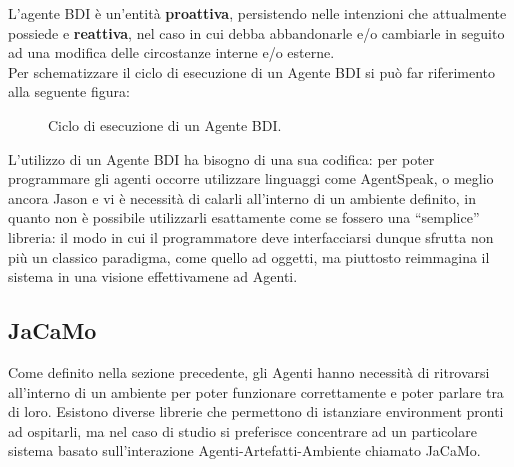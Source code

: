 \documentclass[12pt,a4paper,openright,oneside]{report}
\newcommand{\quotes}[1]{``#1''}
\begin{document}
L'agente BDI è un'entità \textbf{proattiva}, persistendo nelle intenzioni che attualmente possiede e \textbf{reattiva}, nel caso in cui debba abbandonarle e/o cambiarle in seguito ad una modifica delle circostanze interne e/o esterne.\\

Per schematizzare il ciclo di esecuzione di un Agente BDI si può far riferimento alla seguente figura:

\begin{figure}[h]
	\centering
	\caption{Ciclo di esecuzione di un Agente BDI.}
	\label{fig:jacamo}
\end{figure}

L'utilizzo di un Agente BDI ha bisogno di una sua codifica: per poter programmare gli agenti occorre utilizzare linguaggi come AgentSpeak, o meglio ancora Jason e vi è necessità di calarli all'interno di un ambiente definito, in quanto non è possibile utilizzarli esattamente come se fossero una \quotes{semplice} libreria: il modo in cui il programmatore deve interfacciarsi dunque sfrutta non più un classico paradigma, come quello ad oggetti, ma piuttosto reimmagina il sistema in una visione effettivamene ad Agenti.

\subsection{JaCaMo}
Come definito nella sezione precedente, gli Agenti hanno necessità di ritrovarsi all'interno di un ambiente per poter funzionare correttamente e poter parlare tra di loro. Esistono diverse librerie che permettono di istanziare environment pronti ad ospitarli, ma nel caso di studio si preferisce concentrare ad un particolare sistema basato sull'interazione Agenti-Artefatti-Ambiente chiamato JaCaMo.\\
\end{document}
